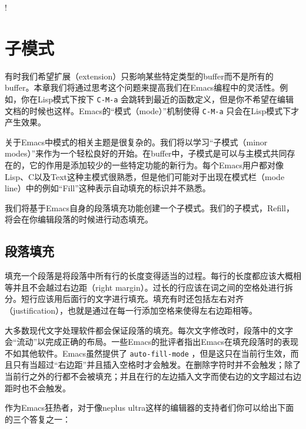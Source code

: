 !\chapter{子模式}
\label{chapter:07-Minor-Mode}


有时我们希望扩展（extension）只影响某些特定类型的buffer而不是所有的buffer。本章我们将通过思考这个问题来提高我们在Emacs编程中的灵活性。例如，你在Lisp模式下按下 \verb|C-M-a| 会跳转到最近的函数定义，但是你不希望在编辑文档的时候也这样。Emacs的“模式（mode）”机制使得 \verb|C-M-a| 只会在Lisp模式下才产生效果。

关于Emacs中模式的相关主题是很复杂的。我们将以学习“子模式（minor modes）”来作为一个轻松良好的开始。在buffer中，子模式是可以与主模式共同存在的，它的作用是添加较少的一些特定功能的新行为。每个Emacs用户都对像Lisp、C以及Text这种主模式很熟悉，但是他们可能对于出现在模式栏（mode line）中的例如“Fill”这种表示自动填充的标识并不熟悉。

我们将基于Emacs自身的段落填充功能创建一个子模式。我们的子模式，Refill，将会在你编辑段落的时候进行动态填充。

\section{段落填充}
\label{section:07-Paragraph-Filling}

填充一个段落是将段落中所有行的长度变得适当的过程。每行的长度都应该大概相等并且不会越过右边距（right margin）。过长的行应该在词之间的空格处进行拆分。短行应该用后面行的文字进行填充。填充有时还包括左右对齐（justification），也就是通过在每一行添加空格来使得左右边距相等。

大多数现代文字处理软件都会保证段落的填充。每次文字修改时，段落中的文字会“流动”以完成正确的布局。一些Emacs的批评者指出Emacs在填充段落时的表现不如其他软件。Emacs虽然提供了 \texttt{auto-fill-mode} ，但是这只在当前行生效，而且只有当超过“右边距”并且插入空格时才会触发。在删除字符时并不会触发；除了当前行之外的行都不会被填充；并且在行的左边插入文字而使右边的文字超过右边距时也不会触发。

作为Emacs狂热者，对于像neplus ultra这样的编辑器的支持者们你可以给出下面的三个答复之一：


